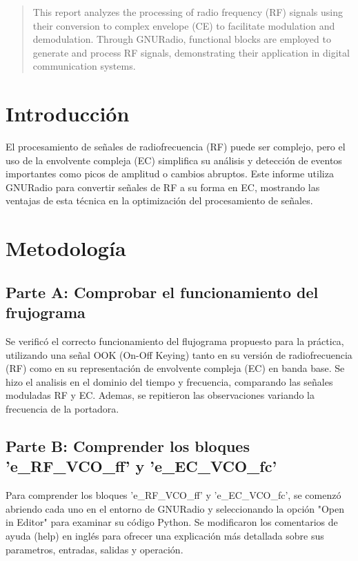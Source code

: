 \documentclass{journal}[IEEEtran, twocolumn]             %
\begin{document}
\begin{multicols}{2}

\begin{abstract}
This report analyzes the processing of radio frequency (RF) signals using their conversion to complex envelope (CE) to facilitate modulation and demodulation. Through GNURadio, functional blocks are employed to generate and process RF signals, demonstrating their application in digital communication systems.    
\end{abstract}

\section{Introducción}
  El procesamiento de señales de radiofrecuencia (RF) puede ser complejo, pero el uso de la envolvente compleja (EC) simplifica su análisis y detección de eventos importantes como picos de amplitud o cambios abruptos. Este informe utiliza GNURadio para convertir señales de RF a su forma en EC, mostrando las ventajas de esta técnica en la optimización del procesamiento de señales.


\section{Metodología}

\subsection{Parte A: Comprobar el funcionamiento del frujograma}
Se verificó el correcto funcionamiento del flujograma propuesto para la práctica, utilizando una señal OOK (On-Off Keying) tanto en su versión de radiofrecuencia (RF) como en su representación de envolvente compleja (EC) en banda base. Se hizo el analisis en el dominio del tiempo y frecuencia, comparando las señales moduladas RF y EC. Ademas, se repitieron las observaciones variando la frecuencia de la portadora. \cite{flujgrama}

\subsection{Parte B: Comprender los bloques 'e\_RF\_VCO\_ff' y 'e\_EC\_VCO\_fc'}
Para comprender los bloques 'e\_RF\_VCO\_ff' y 'e\_EC\_VCO\_fc', se comenzó abriendo cada uno en el entorno de GNURadio y seleccionando la opción "Open in Editor" para examinar su código Python. Se modificaron los comentarios de ayuda (help) en inglés para ofrecer una explicación más detallada sobre sus parametros, entradas, salidas y operación.


\end{multicols}
\end{document}

